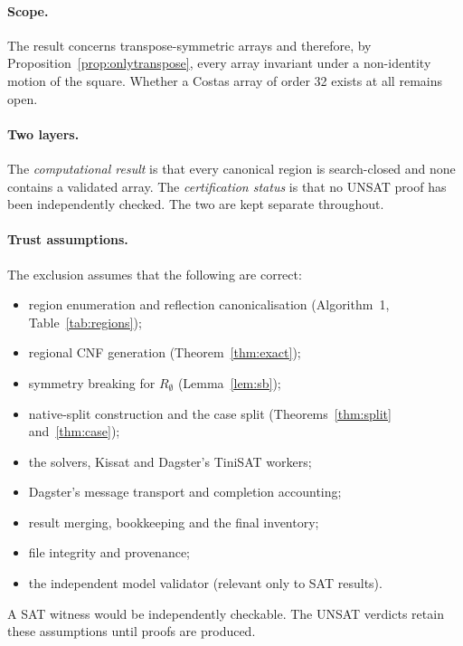 \documentclass[11pt,a4paper]{article}
\theoremstyle{definition}
\newcommand{\st}[1]{\textsf{#1}}
\begin{document}
\paragraph{Scope.} The result concerns transpose-symmetric arrays and therefore, by
Proposition~\ref{prop:onlytranspose}, every array invariant under a non-identity motion of the
square. Whether a Costas array of order 32
exists at all remains open.

\paragraph{Two layers.} The \emph{computational result} is that every canonical region is
\st{search-closed} and none contains a validated array. The \emph{certification status} is
that no UNSAT proof has been independently checked. The two are kept separate throughout.

\paragraph{Trust assumptions.} The exclusion assumes that the following are correct:
\begin{itemize}
\item region enumeration and reflection canonicalisation (Algorithm~1, Table~\ref{tab:regions});
\item regional CNF generation (Theorem~\ref{thm:exact});
\item symmetry breaking for $R_\emptyset$ (Lemma~\ref{lem:sb});
\item native-split construction and the case split (Theorems~\ref{thm:split} and~\ref{thm:case});
\item the solvers, Kissat and Dagster's TiniSAT workers;
\item Dagster's message transport and completion accounting;
\item result merging, bookkeeping and the final inventory;
\item file integrity and provenance;
\item the independent model validator (relevant only to SAT results).
\end{itemize}
A SAT witness would be independently checkable. The UNSAT verdicts retain these assumptions
until proofs are produced.
\end{document}
